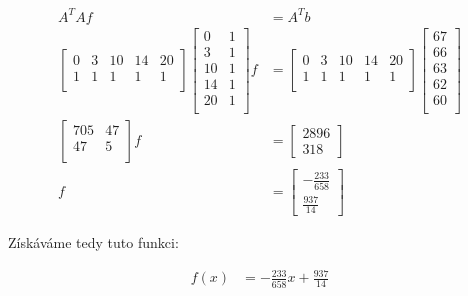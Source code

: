 \documentclass{article}
\begin{document}
\begin{align*}
    A^T A f & = A^Tb \\
    \begin{bmatrix}
        0 & 3 & 10 & 14 & 20 \\
        1 & 1 & 1  & 1  & 1  \\
    \end{bmatrix}
    \begin{bmatrix}
        0  & 1 \\
        3  & 1 \\
        10 & 1 \\
        14 & 1 \\
        20 & 1 \\
    \end{bmatrix}
    f       & =
    \begin{bmatrix}
        0 & 3 & 10 & 14 & 20 \\
        1 & 1 & 1  & 1  & 1  \\
    \end{bmatrix}
    \begin{bmatrix}
        67 \\
        66 \\
        63 \\
        62 \\
        60 \\
    \end{bmatrix}   \\
    \begin{bmatrix}
        705 & 47 \\
        47  & 5  \\
    \end{bmatrix} f
            & =
    \begin{bmatrix}
        2896 \\
        318
    \end{bmatrix}   \\
    f       & =
    \begin{bmatrix}
        -\frac{233}{658} \\
        \frac{937}{14}
    \end{bmatrix}
\end{align*}

Získáváme tedy tuto funkci:

\begin{align*}
    f(x) & = -\frac{233}{658} x + \frac{937}{14}
\end{align*}
\end{document}
